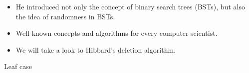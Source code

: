 \documentclass{beamer}
\begin{document}
\begin{frame}
    \begin{itemize}
        \item He introduced not only the concept of binary search trees (BSTs), but also the idea of randomness in BSTs.
            \pause
        \item Well-known concepts and algorithms for every computer scientist.
            \pause
        \item We will take a look to Hibbard's deletion algorithm.
    \end{itemize}
\end{frame}

\begin{frame}{Leaf case}
    \begin{center}


    \end{center}
\end{frame}
\end{document}

